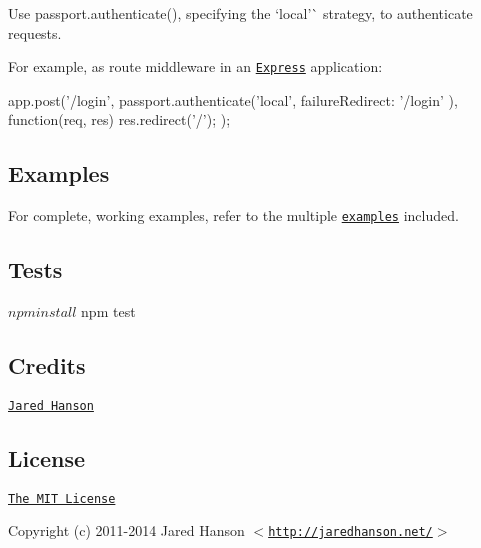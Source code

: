 Use {\ttfamily passport.\+authenticate()}, specifying the `\textquotesingle{}local'\`{} strategy, to authenticate requests.

For example, as route middleware in an \href{http://expressjs.com/}{\tt Express} application\+: \begin{DoxyVerb}app.post('/login', 
  passport.authenticate('local', { failureRedirect: '/login' }),
  function(req, res) {
    res.redirect('/');
  });
\end{DoxyVerb}


\subsection*{Examples}

For complete, working examples, refer to the multiple \href{https://github.com/jaredhanson/passport-local/tree/master/examples}{\tt examples} included.

\subsection*{Tests}

\begin{DoxyVerb}$ npm install
$ npm test
\end{DoxyVerb}


\subsection*{Credits}


\begin{DoxyItemize}
\item \href{http://github.com/jaredhanson}{\tt Jared Hanson}
\end{DoxyItemize}

\subsection*{License}

\href{http://opensource.org/licenses/MIT}{\tt The M\+IT License}

Copyright (c) 2011-\/2014 Jared Hanson $<$\href{http://jaredhanson.net/}{\tt http\+://jaredhanson.\+net/}$>$ 